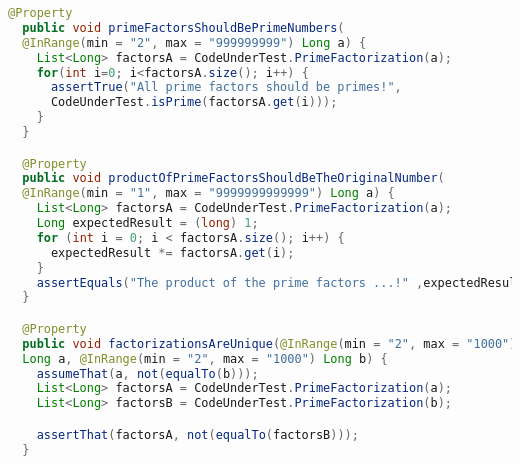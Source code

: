 \documentclass[language=en,sheet=2,prefix]{exercise}
\begin{document}
\begin{solution}
\begin{lstlisting}[language=Java,gobble=2]
  @Property
  public void primeFactorsShouldBePrimeNumbers(
  @InRange(min = "2", max = "999999999") Long a) {
    List<Long> factorsA = CodeUnderTest.PrimeFactorization(a);    	
    for(int i=0; i<factorsA.size(); i++) {
      assertTrue("All prime factors should be primes!", 
      CodeUnderTest.isPrime(factorsA.get(i)));
    }
  }

  @Property 
  public void productOfPrimeFactorsShouldBeTheOriginalNumber(
  @InRange(min = "1", max = "9999999999999") Long a) {
    List<Long> factorsA = CodeUnderTest.PrimeFactorization(a);
    Long expectedResult = (long) 1;
    for (int i = 0; i < factorsA.size(); i++) {
      expectedResult *= factorsA.get(i);
    }
    assertEquals("The product of the prime factors ...!" ,expectedResult, a);
  }

  @Property
  public void factorizationsAreUnique(@InRange(min = "2", max = "1000") 
  Long a, @InRange(min = "2", max = "1000") Long b) {
    assumeThat(a, not(equalTo(b)));
    List<Long> factorsA = CodeUnderTest.PrimeFactorization(a);    	
    List<Long> factorsB = CodeUnderTest.PrimeFactorization(b);    	

    assertThat(factorsA, not(equalTo(factorsB)));
  }

\end{lstlisting}
\end{solution}
\end{document}
